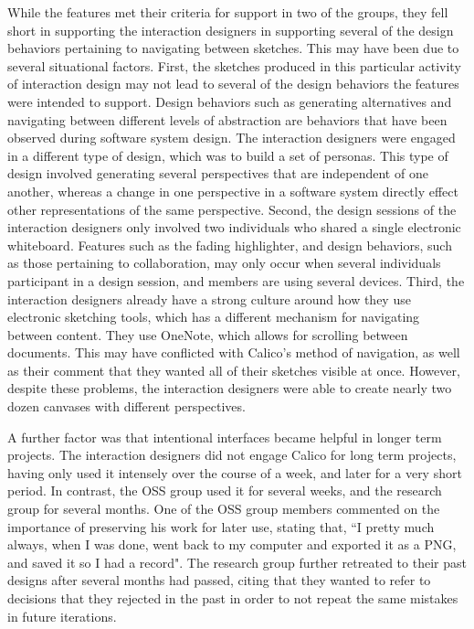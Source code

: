 While the features met their criteria for support in two of the groups, they fell short in supporting the interaction designers in supporting several of the design behaviors pertaining to navigating between sketches. This may have been due to several situational factors. First, the sketches produced in this particular activity of interaction design may not lead to several of the design behaviors the features were intended to support. Design behaviors such as generating alternatives and navigating between different levels of abstraction are behaviors that have been observed during software system design. The interaction designers were engaged in a different type of design, which was to build a set of personas. This type of design involved generating several perspectives that are independent of one another, whereas a change in one perspective in a software system directly effect other representations of the same perspective. Second, the design sessions of the interaction designers only involved two individuals who shared a single electronic whiteboard. Features such as the fading highlighter, and design behaviors, such as those pertaining to collaboration, may only occur when several individuals participant in a design session, and members are using several devices. Third, the interaction designers already have a strong culture around how they use electronic sketching tools, which has a different mechanism for navigating between content. They use OneNote, which allows for scrolling between documents. This may have conflicted with Calico's method of navigation, as well as their comment that they wanted all of their sketches visible at once. However, despite these problems, the interaction designers were able to create nearly two dozen canvases with different perspectives.



A further factor was that intentional interfaces became helpful in longer term projects. The interaction designers did not engage Calico for long term projects, having only used it intensely over the course of a week, and later for a very short period. In contrast, the OSS group used it for several weeks, and the research group for several months. One of the OSS group members commented on the importance of preserving his work for later use, stating that, ``I pretty much always, when I was done, went back to my computer and exported it as a PNG, and saved it so I had a record". The research group further retreated to their past designs after several months had passed, citing that they wanted to refer to decisions that they rejected in the past in order to not repeat the same mistakes in future iterations. 

